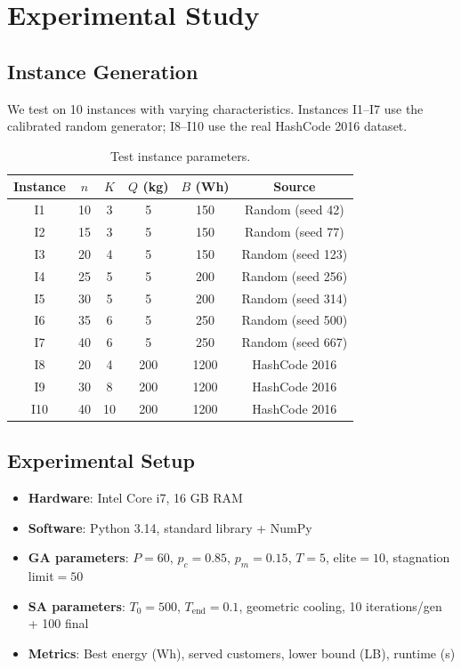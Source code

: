 \documentclass[12pt,a4paper]{article}
\begin{document}
\section{Experimental Study}

\subsection{Instance Generation}
We test on 10 instances with varying characteristics. Instances I1--I7 use the calibrated random generator; I8--I10 use the real HashCode 2016 dataset.

\begin{table}[H]\centering
\begin{tabular}{cccccc}\toprule
\textbf{Instance} & $n$ & $K$ & $Q$ (kg) & $B$ (Wh) & \textbf{Source} \\\midrule
I1  & 10 & 3 & 5   & 150  & Random (seed 42)  \\
I2  & 15 & 3 & 5   & 150  & Random (seed 77)  \\
I3  & 20 & 4 & 5   & 150  & Random (seed 123) \\
I4  & 25 & 5 & 5   & 200  & Random (seed 256) \\
I5  & 30 & 5 & 5   & 200  & Random (seed 314) \\
I6  & 35 & 6 & 5   & 250  & Random (seed 500) \\
I7  & 40 & 6 & 5   & 250  & Random (seed 667) \\
I8  & 20 & 4 & 200 & 1200 & HashCode 2016     \\
I9  & 30 & 8 & 200 & 1200 & HashCode 2016     \\
I10 & 40 & 10& 200 & 1200 & HashCode 2016     \\
\bottomrule
\end{tabular}
\caption{Test instance parameters.}
\end{table}

\subsection{Experimental Setup}
\begin{itemize}[nosep]
  \item \textbf{Hardware}: Intel Core i7, 16 GB RAM
  \item \textbf{Software}: Python 3.14, standard library + NumPy
  \item \textbf{GA parameters}: $P=60$, $p_c=0.85$, $p_m=0.15$, $T=5$, elite$=10$, stagnation limit$=50$
  \item \textbf{SA parameters}: $T_0=500$, $T_{\text{end}}=0.1$, geometric cooling, 10 iterations/gen + 100 final
  \item \textbf{Metrics}: Best energy (Wh), served customers, lower bound (LB), runtime (s)
\end{itemize}
\end{document}
